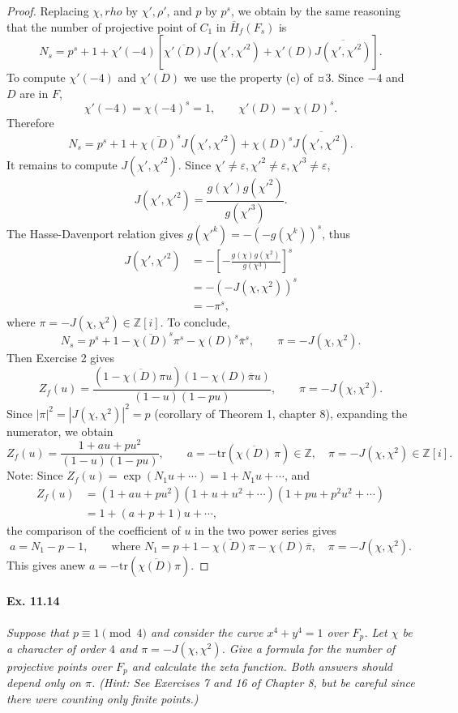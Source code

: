 \documentclass[11pt,a4paper]{article}
\newcommand{\Z}{\mathbb{Z}}
\begin{document}
\begin{proof}
Replacing $\chi, rho$ by $\chi',\rho'$, and $p$ by $p^s$, we obtain by the same reasoning that the number of projective point of $C_1$ in $\overline{H}_f(F_s)$ is
$$N_s = p^s+1 + \chi'(-4)\left[\overline{\chi'(D)} J(\chi',\chi'^2) +\chi'(D) \overline{J(\chi',\chi'^2)}\right].$$
To compute $\chi'(-4)$ and $\chi'(D)$ we use the property (c) of ¤3. Since $-4$ and $D$ are in $F$,
$$\chi'(-4) = \chi(-4) ^s = 1,\qquad \chi'(D) = \chi(D)^s.$$
Therefore
$$N_s = p^s+1 + \overline{\chi(D)}^s J(\chi',\chi'^2) +\chi(D)^s \overline{J(\chi',\chi'^2)}.$$
It remains to compute $J(\chi',\chi'^2)$. Since $\chi' \ne \varepsilon, \chi'^2 \ne \varepsilon, \chi'^3 \ne \varepsilon$,
$$J(\chi',\chi'^2) = \frac{g(\chi') g(\chi'^2)}{g(\chi'^3)}.$$
The Hasse-Davenport relation gives $g(\chi'^k) = - (- g(\chi^k))^s$, thus
\begin{align*}
J(\chi',\chi'^2) &= - \left[- \frac{ g(\chi) g(\chi^2)}{g(\chi^3)}\right]^s\\
&= - (-J(\chi,\chi^2))^s\\
&= -\pi^s,
\end{align*}
where $\pi =-J(\chi,\chi^2) \in \Z[i]$. To conclude,
$$N_s = p^s + 1 - \overline{\chi(D)}^s \pi^s - \chi(D)^s \overline{\pi}^s,\qquad \pi = -J(\chi,\chi^2).$$
Then Exercise 2 gives
$$Z_f(u) = \frac{(1- \overline{\chi(D)} \pi u)(1 - \chi(D) \overline{\pi}u)}{(1-u)(1-pu)},\qquad \pi = -J(\chi,\chi^2).$$
Since $|\pi|^2 = |J(\chi,\chi^2)|^2 = p$ (corollary of Theorem 1, chapter 8), expanding the numerator, we obtain
$$Z_f(u) = \frac{1  + a u + pu^2}{(1-u)(1-pu)},\qquad a = -\mathrm{tr}\left(\overline{\chi(D)} \, \pi \right) \in \Z, \quad \pi = - J(\chi,\chi^2) \in \Z[i].$$
\bigskip
Note: Since $Z_f(u) =\exp(N_1u+ \cdots) = 1 + N_1 u + \cdots$, and
\begin{align*}
Z_f(u) &= (1 +au + pu^2)(1 + u + u^2+\cdots)(1+pu+p^2 u^2 + \cdots)\\
&= 1 + (a+p+1) u + \cdots,
\end{align*}
the comparison of the coefficient of $u$ in the two power series gives
$$a = N_1 - p - 1, \qquad \text{where } N_1 = p+1 - \overline{\chi(D)} \pi - \chi(D) \overline{\pi}, \quad \pi = - J(\chi,\chi^2).$$
This gives anew $a=  -\mathrm{tr}\left(\overline{\chi(D)}\pi\right)$.


\end{proof}

\paragraph{Ex. 11.14}{\it Suppose that $p\equiv 1 \pmod 4$ and consider the curve $x^4 + y^4 = 1$ over $F_p$. Let $\chi$ be a character of order $4$ and $\pi = -J(\chi,\chi^2)$. Give a formula for the number of projective points over $F_p$ and calculate the zeta function. Both answers should depend only on $\pi$. (Hint: See Exercises 7 and 16 of Chapter 8, but be careful since there were counting only finite points.)
}
\end{document}
